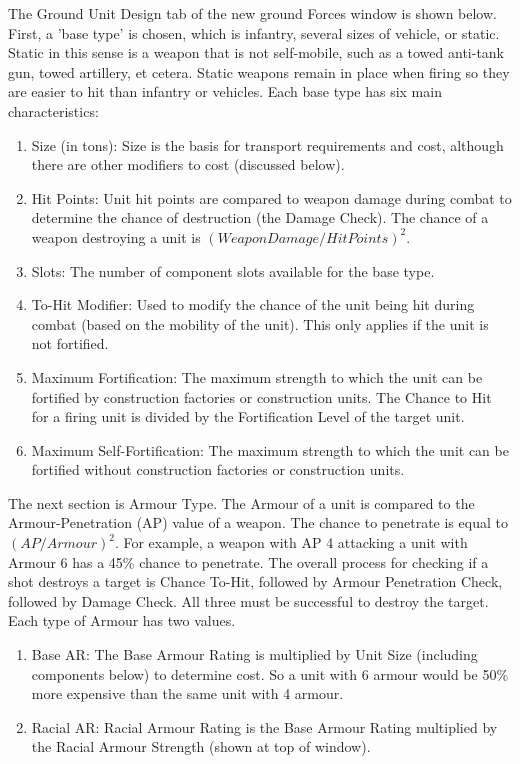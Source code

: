 \documentclass[../Aurora C# unofficial manual.tex]{subfiles}
\begin{document}
	The Ground Unit Design tab of the new ground Forces window is shown below. First, a 'base type' is chosen, which is infantry, several sizes of vehicle, or static. Static in this sense is a weapon that is not self-mobile, such as a towed anti-tank gun, towed artillery, et cetera. Static weapons remain in place when firing so they are easier to hit than infantry or vehicles. Each base type has six main characteristics:
	\begin{enumerate}
		\item Size (in tons): Size is the basis for transport requirements and cost, although there are other modifiers to cost (discussed below).
		\item Hit Points: Unit hit points are compared to weapon damage during combat to determine the chance of destruction (the Damage Check). The chance of a weapon destroying a unit is \( (Weapon Damage / Hit Points)^{2} \).
		\item Slots: The number of component slots available for the base type.
		\item To-Hit Modifier: Used to modify the chance of the unit being hit during combat (based on the mobility of the unit). This only applies if the unit is not fortified.
		\item Maximum Fortification: The maximum strength to which the unit can be fortified by construction factories or construction units. The Chance to Hit for a firing unit is divided by the Fortification Level of the target unit.
		\item Maximum Self-Fortification: The maximum strength to which the unit can be fortified without construction factories or construction units.
	\end{enumerate}
	
	The next section is Armour Type. The Armour of a unit is compared to the Armour-Penetration (AP) value of a weapon. The chance to penetrate is equal to \( (AP / Armour)^{2} \). For example, a weapon with AP 4 attacking a unit with Armour 6 has a 45\% chance to penetrate. The overall process for checking if a shot destroys a target is Chance To-Hit, followed by Armour Penetration Check, followed by Damage Check. All three must be successful to destroy the target. Each type of Armour has two values.
	\begin{enumerate}
		\item Base AR: The Base Armour Rating is multiplied by Unit Size (including components below) to determine cost. So a unit with 6 armour would be 50\% more expensive than the same unit with 4 armour.
		\item Racial AR: Racial Armour Rating is the Base Armour Rating multiplied by the Racial Armour Strength (shown at top of window).
	\end{enumerate}
	
\end{document}
